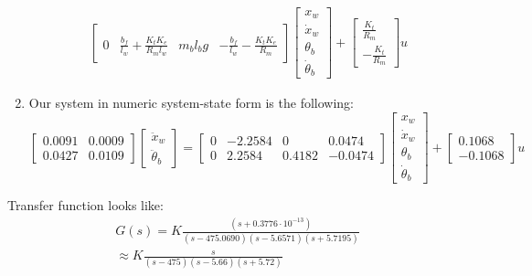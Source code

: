 \documentclass[11pt]{article} %
\begin{document}
\begin{enumerate}
\begin{equation*}
\begin{aligned}
\begin{bmatrix}
        \\[1.2em]
        0 &
        \frac{b_f}{l_w} + \frac{K_t K_e}{R_m l_w} &
        m_b l_b g &
        - \frac{b_f}{l_w} - \frac{K_t K_e}{R_m}
      \end{bmatrix}
      \begin{bmatrix}
        x_w\\
        \dot{x}_w\\
        \theta_b\\
        \dot{\theta}_b
      \end{bmatrix}
      +
      \begin{bmatrix}
        \frac{K_t}{R_m} \\[1.2em]
        -\frac{K_t}{R_m}
      \end{bmatrix}
      u
    \end{aligned}
  \end{equation*}
\item %
  Our system in numeric system-state form is the following:
  \begin{equation*}
    \begin{bmatrix}
      0.0091 & 0.0009 \\
      0.0427 & 0.0109
    \end{bmatrix}
    \begin{bmatrix}
      \ddot{x}_w \\
      \ddot{\theta}_b
    \end{bmatrix}
    =
    \begin{bmatrix}
      0 & -2.2584 & 0 & 0.0474 \\
      0 & 2.2584 & 0.4182 & -0.0474
    \end{bmatrix}
    \begin{bmatrix}
      x_w\\
      \dot{x}_w\\
      \theta_b\\
      \dot{\theta}_b
    \end{bmatrix}
    +
    \begin{bmatrix}
      0.1068 \\
      -0.1068
    \end{bmatrix}
    u
  \end{equation*}
\end{enumerate}
Transfer function looks like:
\begin{equation}
    \begin{aligned}
	G(s) = K\frac{(s+0.3776 \cdot 10^{-13})}{(s-475.0690)(s-5.6571)(s+5.7195)}\\
	\approx K\frac{s}{(s-475)(s-5.66)(s+5.72)}
    \end{aligned}
\end{equation}
\end{document}
